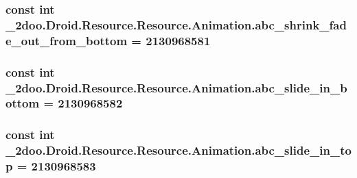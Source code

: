 \hypertarget{class__2doo_1_1_droid_1_1_resource_1_1_animation_e445abe7217569c4157e40cfb0d64ced}{
\subsubsection[{abc\_\-shrink\_\-fade\_\-out\_\-from\_\-bottom}]{\setlength{\rightskip}{0pt plus 5cm}const int \_\-2doo.Droid.Resource.Resource.Animation.abc\_\-shrink\_\-fade\_\-out\_\-from\_\-bottom = 2130968581}}
\label{class__2doo_1_1_droid_1_1_resource_1_1_animation_e445abe7217569c4157e40cfb0d64ced}


\hypertarget{class__2doo_1_1_droid_1_1_resource_1_1_animation_d6a843354b188992742e663629f8c7aa}{
\subsubsection[{abc\_\-slide\_\-in\_\-bottom}]{\setlength{\rightskip}{0pt plus 5cm}const int \_\-2doo.Droid.Resource.Resource.Animation.abc\_\-slide\_\-in\_\-bottom = 2130968582}}
\label{class__2doo_1_1_droid_1_1_resource_1_1_animation_d6a843354b188992742e663629f8c7aa}


\hypertarget{class__2doo_1_1_droid_1_1_resource_1_1_animation_193ff33cbbf63f7a02e40f61d600c91a}{
\subsubsection[{abc\_\-slide\_\-in\_\-top}]{\setlength{\rightskip}{0pt plus 5cm}const int \_\-2doo.Droid.Resource.Resource.Animation.abc\_\-slide\_\-in\_\-top = 2130968583}}
\label{class__2doo_1_1_droid_1_1_resource_1_1_animation_193ff33cbbf63f7a02e40f61d600c91a}


